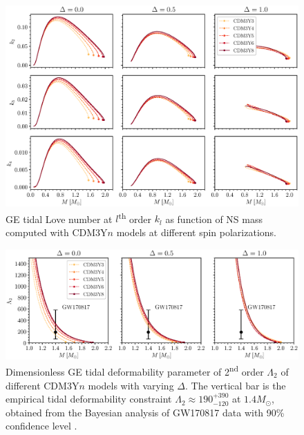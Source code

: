 \begin{figure}[ht!]
        \centering
        \includegraphics[width=\textwidth]{fig/kl.eps}
        \caption{\gls{GE} tidal Love number at $l$\textsuperscript{th} order $k_l$ as function of \gls{NS} mass computed with CDM3Y$n$ models at different spin polarizations.}
        \label{fig:kl}
\end{figure} 
\begin{figure}[ht!]
    \centering
    \includegraphics[width=\textwidth]{fig/Lambda2.eps}
    \caption{Dimensionless \gls{GE} tidal deformability parameter of 2\textsuperscript{nd} order $\Lambda_2$ of different CDM3Y$n$ models with varying $\Delta$. The vertical bar is the empirical tidal deformability constraint $\Lambda_2 \approx 190_{-120}^{+390}$ at $1.4M_\odot$, obtained from the Bayesian analysis of GW170817 data with 90\% confidence level \citep{abbott2018gw170817}.}
    \label{fig:Lambda2}
\end{figure} 
